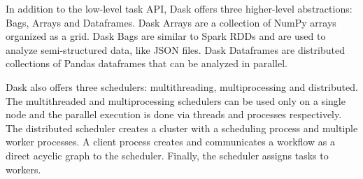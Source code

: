 In addition to the low-level task API, Dask offers three higher-level
abstractions: Bags, Arrays and Dataframes. Dask Arrays are a collection of NumPy
arrays organized as a grid. Dask Bags are similar to Spark RDDs and are used to
analyze semi-structured data, like JSON files. Dask Dataframes are distributed
collections of Pandas dataframes that can be analyzed in parallel.

Dask also offers three schedulers: multithreading, multiprocessing and
distributed. The multithreaded and multiprocessing schedulers can be used only
on a single node and the parallel execution is done via threads and processes
respectively. The distributed scheduler creates a cluster with a scheduling
process and multiple worker processes. A client process creates and communicates
a workflow as a direct acyclic graph to the scheduler. Finally, the scheduler
assigns tasks to workers.




